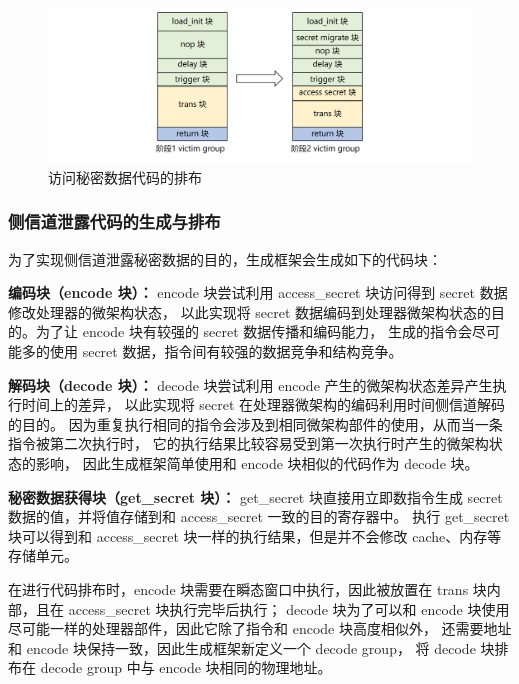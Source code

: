 \begin{figure}[!h]
    \centering
    \includegraphics[width=\linewidth]{figure/paper/stage2-access-secret.png}
    \caption{访问秘密数据代码的排布}
    \label{paper:access-secret}
\end{figure}

\subsubsection{侧信道泄露代码的生成与排布}

为了实现侧信道泄露秘密数据的目的，生成框架会生成如下的代码块：\par

\textbf{编码块（encode 块）：}
encode 块尝试利用 access\_secret 块访问得到 secret 数据修改处理器的微架构状态，
以此实现将 secret 数据编码到处理器微架构状态的目的。为了让 encode 块有较强的 secret 数据传播和编码能力，
生成的指令会尽可能多的使用 secret 数据，指令间有较强的数据竞争和结构竞争。\par

\textbf{解码块（decode 块）：}
decode 块尝试利用 encode 产生的微架构状态差异产生执行时间上的差异，
以此实现将 secret 在处理器微架构的编码利用时间侧信道解码的目的。
因为重复执行相同的指令会涉及到相同微架构部件的使用，从而当一条指令被第二次执行时，
它的执行结果比较容易受到第一次执行时产生的微架构状态的影响，
因此生成框架简单使用和 encode 块相似的代码作为 decode 块。\par

\textbf{秘密数据获得块（get\_secret 块）：}
get\_secret 块直接用立即数指令生成 secret 数据的值，并将值存储到和 access\_secret 一致的目的寄存器中。
执行 get\_secret 块可以得到和 access\_secret 块一样的执行结果，但是并不会修改 cache、内存等存储单元。

在进行代码排布时，encode 块需要在瞬态窗口中执行，因此被放置在 trans 块内部，且在 access\_secret 块执行完毕后执行；
decode 块为了可以和 encode 块使用尽可能一样的处理器部件，因此它除了指令和 encode 块高度相似外，
还需要地址和 encode 块保持一致，因此生成框架新定义一个 decode group，
将 decode 块排布在 decode group 中与 encode 块相同的物理地址。\par

